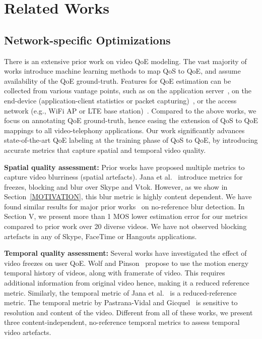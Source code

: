 \section{Related Works}
\subsection{Network-specific Optimizations}
There is an extensive prior work on video QoE modeling. The vast majority of works \cite{aggarwal2014prometheus,balachandran2013developing,fiedler2010generic} introduce machine learning methods to map QoS to QoE, and assume availability of the QoE ground-truth. Features for QoE estimation can be collected from various vantage points, such as on the application server~\cite{balachandran2013developing}, on the end-device (application-client statistics or packet capturing)~\cite{zhang2012profiling,yu2014can,seufert2015survey,aggarwal2014prometheus,balachandran2012quest,chen2014qoe}, or the access network (e.g., WiFi AP or LTE base station)~\cite{chakraborty2016exbox,jana2016qoe,chen2006quantifying}. Compared to the above works, we focus on annotating QoE ground-truth, hence easing the extension of QoS to QoE mappings to all video-telephony applications. Our work significantly advances state-of-the-art QoE labeling at the training phase of QoS to QoE, by introducing accurate metrics that capture spatial and temporal video quality.

\noindent
\textbf{Spatial quality assessment:}  Prior works have proposed multiple metrics to capture video blurriness (spatial artefacts). Jana et al.~\cite{jana2016qoe} introduce metrics for freezes, blocking and blur over Skype and Vtok. However, as we show in Section~\ref{MOTIVATION}, this blur metric is highly content dependent. We have found similar results for major prior works~\cite{golestaneh2014no, mittal2012no,tong2004blur,marziliano2002no} on no-reference blur detection. In Section V, we present more than 1 MOS lower estimation error for our metrics compared to prior work over 20 diverse videos. We have not observed blocking artefacts in any of Skype, FaceTime or Hangouts applications.

\noindent
\textbf{Temporal quality assessment:} Several works \cite{wolf2009no, borer2010model, usman2017no, pastrana2006automatic} have investigated the effect of video freezes on user QoE. Wolf and Pinson~\cite{wolf2009no} propose to use the motion energy temporal history of videos, along with framerate of video. This requires additional information from original video hence, making it a reduced reference metric. Similarly, the temporal metric of Jana et al.~\cite{jana2016qoe} is a reduced-reference metric. The temporal metric by Pastrana-Vidal and Gicquel~\cite{pastrana2006automatic} is sensitive to resolution and content of the video. Different from all of these works, we present three content-independent, no-reference temporal metrics to assess temporal video artefacts.

